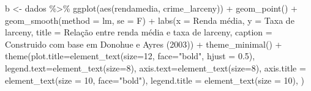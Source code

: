 \documentclass[
]{article}
\newenvironment{Shaded}{\begin{snugshade}}{\end{snugshade}}
\newcommand{\AttributeTok}[1]{\textcolor[rgb]{0.77,0.63,0.00}{#1}}
\newcommand{\DecValTok}[1]{\textcolor[rgb]{0.00,0.00,0.81}{#1}}
\newcommand{\FloatTok}[1]{\textcolor[rgb]{0.00,0.00,0.81}{#1}}
\newcommand{\FunctionTok}[1]{\textcolor[rgb]{0.00,0.00,0.00}{#1}}
\newcommand{\NormalTok}[1]{#1}
\newcommand{\OtherTok}[1]{\textcolor[rgb]{0.56,0.35,0.01}{#1}}
\newcommand{\SpecialCharTok}[1]{\textcolor[rgb]{0.00,0.00,0.00}{#1}}
\newcommand{\StringTok}[1]{\textcolor[rgb]{0.31,0.60,0.02}{#1}}
\begin{document}
\begin{Shaded}
\begin{Highlighting}[]
\NormalTok{b }\OtherTok{\textless{}{-}}\NormalTok{ dados }\SpecialCharTok{\%\textgreater{}\%} 
  \FunctionTok{ggplot}\NormalTok{(}\FunctionTok{aes}\NormalTok{(rendamedia, crime\_larceny)) }\SpecialCharTok{+}
  \FunctionTok{geom\_point}\NormalTok{() }\SpecialCharTok{+} 
  \FunctionTok{geom\_smooth}\NormalTok{(}\AttributeTok{method =} \StringTok{\textquotesingle{}lm\textquotesingle{}}\NormalTok{, }\AttributeTok{se =}\NormalTok{ F) }\SpecialCharTok{+}
  \FunctionTok{labs}\NormalTok{(}\AttributeTok{x =} \StringTok{\textquotesingle{}Renda média\textquotesingle{}}\NormalTok{,}
       \AttributeTok{y =} \StringTok{\textquotesingle{}Taxa de larceny\textquotesingle{}}\NormalTok{,}
       \AttributeTok{title =} \StringTok{\textquotesingle{}Relação entre renda média e taxa de larceny\textquotesingle{}}\NormalTok{,}
       \AttributeTok{caption =} \StringTok{\textquotesingle{}Construido com base em Donohue e Ayres (2003)\textquotesingle{}}\NormalTok{) }\SpecialCharTok{+} 
  \FunctionTok{theme\_minimal}\NormalTok{() }\SpecialCharTok{+}
  \FunctionTok{theme}\NormalTok{(}\AttributeTok{plot.title=}\FunctionTok{element\_text}\NormalTok{(}\AttributeTok{size=}\DecValTok{12}\NormalTok{, }\AttributeTok{face=}\StringTok{"bold"}\NormalTok{, }\AttributeTok{hjust =} \FloatTok{0.5}\NormalTok{),}
        \AttributeTok{legend.text=}\FunctionTok{element\_text}\NormalTok{(}\AttributeTok{size=}\DecValTok{8}\NormalTok{),}
        \AttributeTok{axis.text=}\FunctionTok{element\_text}\NormalTok{(}\AttributeTok{size=}\DecValTok{8}\NormalTok{),}
        \AttributeTok{axis.title =} \FunctionTok{element\_text}\NormalTok{(}\AttributeTok{size =} \DecValTok{10}\NormalTok{, }\AttributeTok{face=}\StringTok{"bold"}\NormalTok{),}
        \AttributeTok{legend.title =} \FunctionTok{element\_text}\NormalTok{(}\AttributeTok{size =} \DecValTok{10}\NormalTok{),}
\NormalTok{        )}


\end{Highlighting}
\end{Shaded}
\end{document}
